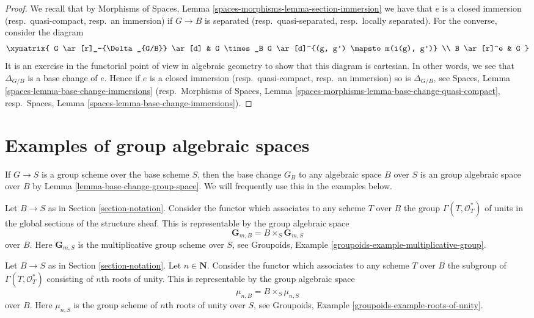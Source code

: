 \begin{proof}
We recall that by
Morphisms of Spaces, Lemma \ref{spaces-morphisms-lemma-section-immersion}
we have that $e$ is a closed immersion (resp.\ quasi-compact, resp.\ an
immersion) if $G \to B$ is separated (resp.\ quasi-separated, resp.\ locally
separated).
For the converse, consider the diagram
$$
\xymatrix{
G \ar[r]_-{\Delta_{G/B}} \ar[d] &
G \times_B G \ar[d]^{(g, g') \mapsto m(i(g), g')} \\
B \ar[r]^e & G
}
$$
It is an exercise in the functorial point of view in algebraic geometry
to show that this diagram is cartesian. In other words, we see that
$\Delta_{G/B}$ is a base change of $e$. Hence if $e$ is a
closed immersion (resp.\ quasi-compact, resp.\ an immersion) so is
$\Delta_{G/B}$, see
Spaces, Lemma \ref{spaces-lemma-base-change-immersions}
(resp.\ Morphisms of Spaces, Lemma
\ref{spaces-morphisms-lemma-base-change-quasi-compact},
resp.\ Spaces, Lemma \ref{spaces-lemma-base-change-immersions}).
\end{proof}











\section{Examples of group algebraic spaces}
\label{section-examples-group-spaces}

\noindent
If $G \to S$ is a group scheme over the base scheme $S$, then the base
change $G_B$ to any algebraic space $B$ over $S$ is an group algebraic
space over $B$ by
Lemma \ref{lemma-base-change-group-space}.
We will frequently use this in the examples below.

\begin{example}
\label{example-multiplicative-group}
Let $B \to S$ as in Section \ref{section-notation}.
Consider the functor which associates to any scheme $T$ over
$B$ the group $\Gamma(T, \mathcal{O}_T^*)$
of units in the global sections of the structure sheaf.
This is representable by the group algebraic space
$$
\mathbf{G}_{m, B} = B \times_S \mathbf{G}_{m, S}
$$
over $B$. Here $\mathbf{G}_{m, S}$ is the multiplicative group scheme
over $S$, see
Groupoids, Example \ref{groupoids-example-multiplicative-group}.
\end{example}

\begin{example}
\label{example-roots-of-unity}
Let $B \to S$ as in Section \ref{section-notation}.
Let $n \in \mathbf{N}$. Consider the functor which associates
to any scheme $T$ over $B$ the subgroup of $\Gamma(T, \mathcal{O}_T^*)$
consisting of $n$th roots of unity.
This is representable by the group algebraic space
$$
\mu_{n, B} = B \times_S \mu_{n, S}
$$
over $B$. Here $\mu_{n, S}$ is the group scheme of $n$th roots of
unity over $S$, see
Groupoids, Example \ref{groupoids-example-roots-of-unity}.
\end{example}

